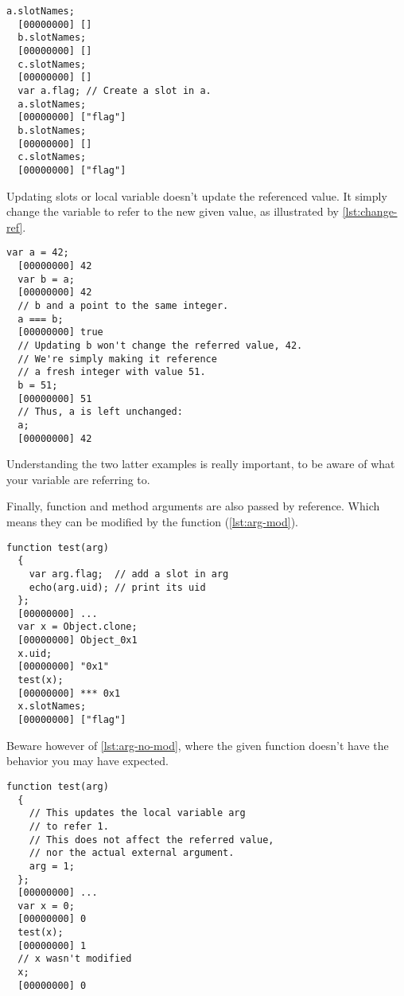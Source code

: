 \documentclass[openright,twoside,12pt]{report}
\begin{document}
\begin{lstlisting}[caption=Shared modification,
  label=lst:same-ref-mod]
  a.slotNames;
  [00000000] []
  b.slotNames;
  [00000000] []
  c.slotNames;
  [00000000] []
  var a.flag; // Create a slot in a.
  a.slotNames;
  [00000000] ["flag"]
  b.slotNames;
  [00000000] []
  c.slotNames;
  [00000000] ["flag"]
\end{lstlisting}

Updating slots or local variable doesn't update the referenced
value. It simply change the variable to refer to the new given value,
as illustrated by \autoref{lst:change-ref}.

\begin{lstlisting}[caption=Updates just change the referee,
  label=lst:change-ref]
  var a = 42;
  [00000000] 42
  var b = a;
  [00000000] 42
  // b and a point to the same integer.
  a === b;
  [00000000] true
  // Updating b won't change the referred value, 42.
  // We're simply making it reference
  // a fresh integer with value 51.
  b = 51;
  [00000000] 51
  // Thus, a is left unchanged:
  a;
  [00000000] 42
\end{lstlisting}

Understanding the two latter examples is really important, to be aware
of what your variable are referring to.

Finally, function and method arguments are also passed by
reference. Which means they can be modified by the function
(\autoref{lst:arg-mod}).

\begin{lstlisting}[caption=Function modifying its argument,
  label=lst:arg-mod]
  function test(arg)
  {
    var arg.flag;  // add a slot in arg
    echo(arg.uid); // print its uid
  };
  [00000000] ...
  var x = Object.clone;
  [00000000] Object_0x1
  x.uid;
  [00000000] "0x1"
  test(x);
  [00000000] *** 0x1
  x.slotNames;
  [00000000] ["flag"]
\end{lstlisting}

Beware however of \autoref{lst:arg-no-mod}, where the given function doesn't
have the behavior you may have expected.

\begin{lstlisting}[caption=Function failing to modify its argument,
  label=lst:arg-no-mod]
  function test(arg)
  {
    // This updates the local variable arg
    // to refer 1.
    // This does not affect the referred value,
    // nor the actual external argument.
    arg = 1;
  };
  [00000000] ...
  var x = 0;
  [00000000] 0
  test(x);
  [00000000] 1
  // x wasn't modified
  x;
  [00000000] 0
\end{lstlisting}
\end{document}
